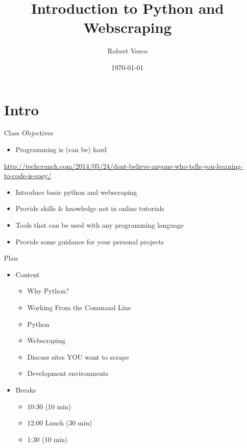 \documentclass[presentation]{beamer}
\institute[Yale]{Yale School of Management}
\author{Robert Vesco}
\date{\today}
\title{Introduction to Python and Webscraping}
\begin{document}
\maketitle

\section{Intro}
\label{sec-1}

\begin{frame}[label=sec-1-0-1]{Class Objectives}
\begin{itemize}
\item Programming is (can be) hard
\end{itemize}
\url{http://techcrunch.com/2014/05/24/dont-believe-anyone-who-tells-you-learning-to-code-is-easy/}

\begin{itemize}
\item Introduce basic python and webscraping
\item Provide skills \& knowledge not in online tutorials
\item Tools that can be used with any programming language
\item Provide some guidance for your personal projects
\end{itemize}
\end{frame}

\begin{frame}[label=sec-1-0-2]{Plan}
\begin{itemize}
\item Content
\begin{itemize}
\item Why Python?
\item Working From the Command Line
\item Python
\item Webscraping
\item Discuss sites YOU want to scrape
\item Development environments
\end{itemize}
\item Breaks 
\begin{itemize}
\item 10:30 (10 min)
\item 12:00 Lunch (30 min)
\item 1:30 (10 min)
\end{itemize}
\end{itemize}
\end{frame}
\end{document}
